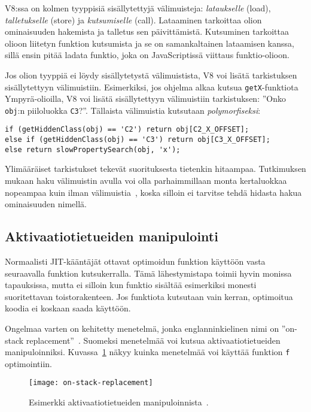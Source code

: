 V8:ssa on kolmen tyyppisiä sisällytettyjä välimuisteja: \textit{lataukselle} (load), \textit{talletukselle} (store) ja \textit{kutsumiselle} (call). Lataaminen tarkoittaa olion ominaisuuden hakemista ja talletus sen päivittämistä. Kutsuminen tarkoittaa olioon liitetyn funktion kutsumista ja se on samankaltainen lataamisen kanssa, sillä ensin pitää ladata funktio, joka on JavaScriptissä viittaus funktio-olioon.

Jos olion tyyppiä ei löydy sisällytetystä välimuistista, V8 voi lisätä tarkistuksen sisällytettyyn välimuistiin. Esimerkiksi, jos ohjelma alkaa kutsua \texttt{getX}-funktiota Ympyrä-olioilla, V8 voi lisätä sisällytettyyn välimuistiin tarkistuksen: ''Onko \texttt{obj}:n piiloluokka \texttt{C3}?''. Tällaista välimuistia kutsutaan \textit{polymorfiseksi}:
\begin{lstlisting}
if (getHiddenClass(obj) == 'C2') return obj[C2_X_OFFSET];
else if (getHiddenClass(obj) == 'C3') return obj[C3_X_OFFSET];
else return slowPropertySearch(obj, 'x');
\end{lstlisting}

Ylimääräiset tarkistukset tekevät suorituksesta tietenkin hitaampaa. Tutkimuksen mukaan haku välimuistin avulla voi olla parhaimmillaan monta kertaluokkaa nopeampaa kuin ilman välimuistia~\cite[s.~498]{Ahn2014}, koska silloin ei tarvitse tehdä hidasta hakua ominaisuuden nimellä.

\subsection{Aktivaatiotietueiden manipulointi}

Normaalisti JIT-kääntäjät ottavat optimoidun funktion käyttöön vasta seuraavalla funktion kutsukerralla. Tämä lähestymistapa toimii hyvin monissa tapauksissa, mutta ei silloin kun funktio sisältää esimerkiksi monesti suoritettavan toistorakenteen. Jos funktiota kutsutaan vain kerran, optimoitua koodia ei koskaan saada käyttöön.

Ongelmaa varten on kehitetty menetelmä, jonka englanninkielinen nimi on ''on-stack replacement''~\cite{osr}. Suomeksi menetelmää voi kutsua aktivaatiotietueiden manipuloinniksi. Kuvassa~\ref{fig:osr} näkyy kuinka menetelmää voi käyttää funktion \texttt{f} optimointiin.

\begin{figure}[ht]
    \texttt{[image: on-stack-replacement]}
    \caption{Esimerkki aktivaatiotietueiden manipuloinnista~\cite{osrpic}.}
     \centering
     \label{fig:osr}
\end{figure}

